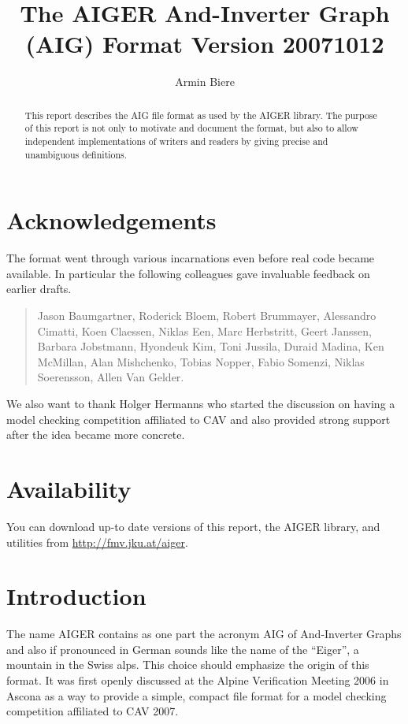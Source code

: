 \documentclass[10pt]{llncs}
\title{The AIGER And-Inverter Graph (AIG) Format Version 20071012}
\author{Armin Biere}
\institute{Johannes Kepler University Linz, Austria}
\begin{document}
\maketitle
\thispagestyle{fancy}

\begin{abstract}
  This report describes the AIG file format as used by the AIGER library.
  The purpose of this report is not only to motivate and document the
  format, but also to allow independent implementations of writers and
  readers by giving precise and unambiguous definitions.
\end{abstract}

\section{Acknowledgements}

  The format went through various incarnations even before real code became
  available.  In particular the following colleagues gave invaluable
  feedback on earlier drafts.

\begin{quote}
      Jason Baumgartner, Roderick Bloem, Robert Brummayer, Alessandro
      Cimatti, Koen Claessen, Niklas Een, Marc Herbstritt, Geert Janssen,
      Barbara Jobstmann, Hyondeuk Kim, Toni Jussila, Duraid Madina,
      Ken McMillan, Alan Mishchenko, Tobias Nopper, Fabio Somenzi, 
      Niklas Soerensson, Allen Van Gelder.
\end{quote}

  We also want to thank Holger Hermanns who started the discussion on having
  a model checking competition affiliated to CAV and also provided strong
  support after the idea became more concrete.

\section{Availability}
  
  You can download up-to date versions of this report, the AIGER library,
  and utilities from \url{http://fmv.jku.at/aiger}.

\section{Introduction}

  The name AIGER contains as one part the acronym AIG of And-Inverter
  Graphs and also if pronounced in German sounds like the name of the
  ``Eiger'', a mountain in the Swiss alps.  This choice should emphasize the
  origin of this format. It was first openly discussed at the Alpine
  Verification Meeting 2006 in Ascona as a way to provide a simple, compact
  file format for a model checking competition affiliated to CAV 2007.
\end{document}
